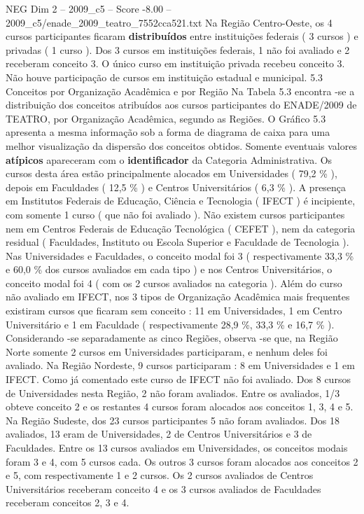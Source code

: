 \begin{textsample}{NEG Dim 2 – 2009\_c5 – Score -8.00 – 2009\_c5/enade\_2009\_teatro\_7552cca521.txt}
Na Região Centro-Oeste, os 4 cursos participantes ficaram \textbf{distribuídos} entre instituições federais ( 3 cursos ) e privadas ( 1 curso ).
Dos 3 cursos em instituições federais, 1 não foi avaliado e 2 receberam conceito 3.
O único curso em instituição privada recebeu conceito 3.
Não houve participação de cursos em instituição estadual e municipal. 5.3 Conceitos por Organização Acadêmica e por Região Na Tabela 5.3 encontra -se a distribuição dos conceitos atribuídos aos cursos participantes do ENADE/2009 de TEATRO, por Organização Acadêmica, segundo as Regiões.
O Gráfico 5.3 apresenta a mesma informação sob a forma de diagrama de caixa para uma melhor visualização da dispersão dos conceitos obtidos.
Somente eventuais valores \textbf{atípicos} apareceram com o \textbf{identificador} da Categoria Administrativa.
Os cursos desta área estão principalmente alocados em Universidades ( 79,2 \% ), depois em Faculdades ( 12,5 \% ) e Centros Universitários ( 6,3 \% ).
A presença em Institutos Federais de Educação, Ciência e Tecnologia ( IFECT ) é incipiente, com somente 1 curso ( que não foi avaliado ).
Não existem cursos participantes nem em Centros Federais de Educação Tecnológica ( CEFET ), nem da categoria residual ( Faculdades, Instituto ou Escola Superior e Faculdade de Tecnologia ).
Nas Universidades e Faculdades, o conceito modal foi 3 ( respectivamente 33,3 \% e 60,0 \% dos cursos avaliados em cada tipo ) e nos Centros Universitários, o conceito modal foi 4 ( com os 2 cursos avaliados na categoria ).
Além do curso não avaliado em IFECT, nos 3 tipos de Organização Acadêmica mais frequentes existiram cursos que ficaram sem conceito : 11 em Universidades, 1 em Centro Universitário e 1 em Faculdade ( respectivamente 28,9 \%, 33,3 \% e 16,7 \% ).
Considerando -se separadamente as cinco Regiões, observa -se que, na Região Norte somente 2 cursos em Universidades participaram, e nenhum deles foi avaliado.
Na Região Nordeste, 9 cursos participaram : 8 em Universidades e 1 em IFECT.
Como já comentado este curso de IFECT não foi avaliado.
Dos 8 cursos de Universidades nesta Região, 2 não foram avaliados.
Entre os avaliados, 1/3 obteve conceito 2 e os restantes 4 cursos foram alocados aos conceitos 1, 3, 4 e 5.
Na Região Sudeste, dos 23 cursos participantes 5 não foram avaliados.
Dos 18 avaliados, 13 eram de Universidades, 2 de Centros Universitários e 3 de Faculdades.
Entre os 13 cursos avaliados em Universidades, os conceitos modais foram 3 e 4, com 5 cursos cada.
Os outros 3 cursos foram alocados aos conceitos 2 e 5, com respectivamente 1 e 2 cursos.
Os 2 cursos avaliados de Centros Universitários receberam conceito 4 e os 3 cursos avaliados de Faculdades receberam conceitos 2, 3 e 4.

\end{textsample}
